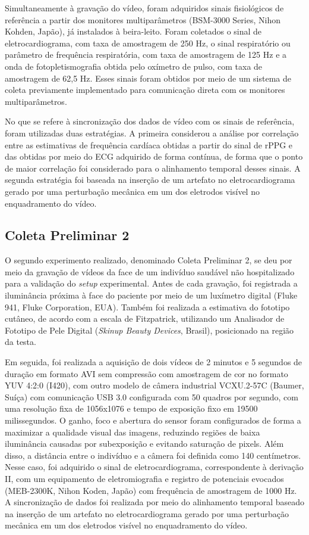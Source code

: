 Simultaneamente à gravação do vídeo, foram adquiridos sinais fisiológicos de referência a partir dos monitores multiparâmetros (BSM-3000 Series, Nihon Kohden, Japão), já instalados à beira-leito. Foram coletados o sinal de eletrocardiograma, com taxa de amostragem de 250 Hz, o sinal respiratório ou parâmetro de frequência respiratória, com taxa de amostragem de 125 Hz e a onda de fotopletismografia obtida pelo oxímetro de pulso, com taxa de amostragem de 62,5 Hz. Esses sinais foram obtidos por meio de um sistema de coleta previamente implementado para comunicação direta com os monitores multiparâmetros.   

No que se refere à sincronização dos dados de vídeo com os sinais de referência, foram utilizadas duas estratégias. A primeira considerou a análise por correlação entre as estimativas de frequência cardíaca obtidas a partir do sinal de rPPG e das obtidas por meio do ECG adquirido de forma contínua, de forma que o ponto de maior correlação foi considerado para o alinhamento temporal desses sinais. A segunda estratégia foi baseada na inserção de um artefato no eletrocardiograma gerado por uma perturbação mecânica em um dos eletrodos visível no enquadramento do vídeo.

\subsection{Coleta Preliminar 2}

O segundo experimento realizado, denominado Coleta Preliminar 2, se deu por meio da gravação de vídeos da face de um indivíduo saudável não hospitalizado para a validação do \textit{setup} experimental. Antes de cada gravação, foi registrada a iluminância próxima à face do paciente por meio de um luxímetro digital (Fluke 941, Fluke Corporation, EUA). Também foi realizada a estimativa do fototipo cutâneo, de acordo com a escala de Fitzpatrick, utilizando um Analisador de Fototipo de Pele Digital (\textit{Skinup Beauty Devices}, Brasil), posicionado na região da testa. 

Em seguida, foi realizada a aquisição de dois vídeos de 2 minutos e 5 segundos de duração em formato AVI sem compressão com amostragem de cor no formato YUV 4:2:0 (I420), com outro modelo de câmera industrial VCXU.2-57C (Baumer, Suíça) com comunicação USB 3.0 configurada com 50 quadros por segundo, com uma resolução fixa de 1056x1076 e tempo de exposição fixo em 19500 milissegundos. O ganho, foco e abertura do sensor foram configurados de forma a maximizar a qualidade visual das imagens, reduzindo regiões de baixa iluminância causadas por subexposição e evitando saturação de pixels. Além disso, a distância entre o indivíduo e a câmera foi definida como 140 centímetros. Nesse caso, foi adquirido o sinal de eletrocardiograma, correspondente à derivação II, com um equipamento de eletromiografia e registro de potenciais evocados (MEB-2300K, Nihon Koden, Japão) com frequência de amostragem de 1000 Hz. A sincronização de dados foi realizada por meio do alinhamento temporal baseado na inserção de um artefato no eletrocardiograma gerado por uma perturbação mecânica em um dos eletrodos visível no enquadramento do vídeo.

